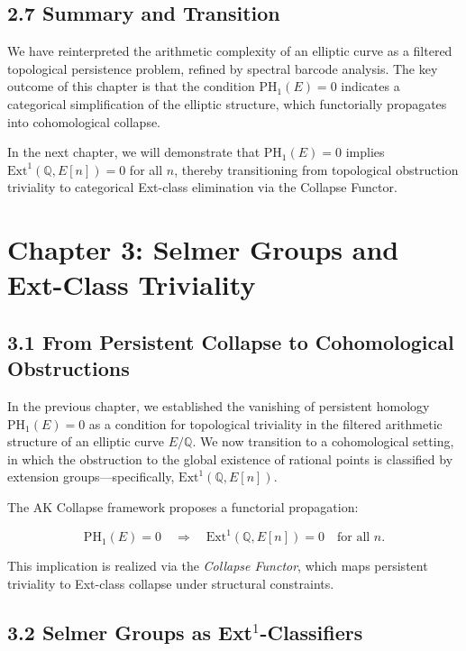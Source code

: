 \documentclass[11pt]{article}
\begin{document}
\subsection{2.7 Summary and Transition}

We have reinterpreted the arithmetic complexity of an elliptic curve as a filtered topological persistence problem, refined by spectral barcode analysis.  
The key outcome of this chapter is that the condition $\mathrm{PH}_1(E)=0$ indicates a categorical simplification of the elliptic structure, which functorially propagates into cohomological collapse.

In the next chapter, we will demonstrate that $\mathrm{PH}_1(E)=0$ implies $\mathrm{Ext}^1(\mathbb{Q},E[n]) = 0$ for all $n$,  
thereby transitioning from topological obstruction triviality to categorical Ext-class elimination via the Collapse Functor.




\section{Chapter 3: Selmer Groups and Ext-Class Triviality}

\subsection{3.1 From Persistent Collapse to Cohomological Obstructions}

In the previous chapter, we established the vanishing of persistent homology $\mathrm{PH}_1(E) = 0$ as a condition for topological triviality in the filtered arithmetic structure of an elliptic curve $E/\mathbb{Q}$.  
We now transition to a cohomological setting, in which the obstruction to the global existence of rational points is classified by extension groups—specifically, $\mathrm{Ext}^1(\mathbb{Q},E[n])$.

The AK Collapse framework proposes a functorial propagation:

\[
\mathrm{PH}_1(E) = 0 \quad \Longrightarrow \quad \mathrm{Ext}^1(\mathbb{Q},E[n]) = 0 \quad \text{for all } n.
\]

This implication is realized via the \emph{Collapse Functor}, which maps persistent triviality to Ext-class collapse under structural constraints.

\subsection{3.2 Selmer Groups as Ext$^1$-Classifiers}
\end{document}
